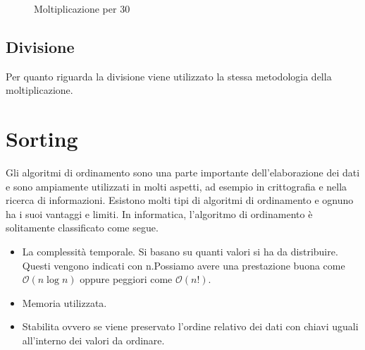 \documentclass[12pt,a4paper]{report}
\begin{document}
\begin{figure}

     \begin{subfigure}[b]{0.3\textwidth}
  
        
         \label{Code:Mul30RISC}
	

     \end{subfigure}
     \hfill
     \begin{subfigure}[b]{0.3\textwidth}
         
          	
		
		 \label{Code:Mul30ARM}
     \end{subfigure}
     \hfill
     \begin{subfigure}[b]{0.3\textwidth}
         
          
	
	 \label{Code:Mul30X86}
     \end{subfigure}
     \caption{Moltiplicazione per 30}
     \end{figure}

\vspace{2cm}

\subsection{Divisione}
Per quanto riguarda la divisione viene utilizzato la stessa metodologia della moltiplicazione.





\section{Sorting}
Gli algoritmi di ordinamento sono una parte importante dell'elaborazione dei dati e sono ampiamente utilizzati in molti aspetti, ad esempio in crittografia e nella ricerca di informazioni. Esistono molti tipi di algoritmi di ordinamento e ognuno ha i suoi vantaggi e limiti. In informatica, l'algoritmo di ordinamento è solitamente classificato come segue.

\begin{itemize}
	\item La complessità temporale.  Si basano su quanti valori si ha da distribuire. Questi vengono indicati con n.Possiamo avere una prestazione buona come $\mathcal{O}(n\log{}n)$ oppure peggiori come $\mathcal{O}(n!)$.
	\item Memoria utilizzata.
	\item Stabilita ovvero se viene preservato l'ordine relativo dei dati con chiavi uguali all'interno dei valori da ordinare.
\end{itemize}
\end{document}
